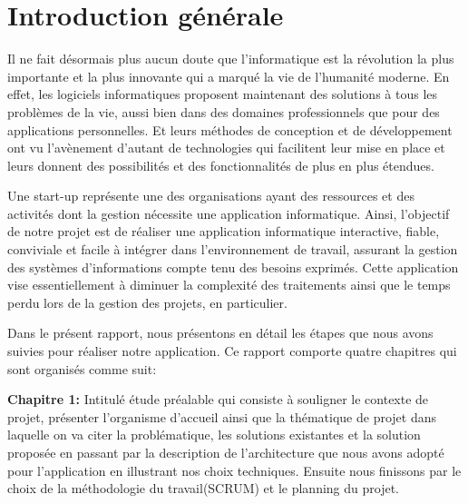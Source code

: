 






\chapter*{Introduction g\'{e}n\'{e}rale}


Il ne fait d\'{e}sormais plus aucun doute que l'informatique est la r\'{e}volution la
plus importante et la plus innovante qui a marqu\'{e} la vie de l'humanit\'{e}
moderne. En effet, les logiciels informatiques proposent maintenant des
solutions \`{a} tous les probl\`{e}mes de la vie, aussi bien dans des domaines
professionnels que pour des applications personnelles. Et leurs m\'{e}thodes de
conception et de d\'{e}veloppement ont vu l'av\`{e}nement d'autant de technologies
qui facilitent leur mise en place et leurs donnent des possibilit\'{e}s et des
fonctionnalit\'{e}s de plus en plus \'{e}tendues.


\bigskip
Une start-up repr\'{e}sente une des organisations ayant des ressources et des
activit\'{e}s dont la gestion n\'{e}cessite une application informatique. Ainsi,
l'objectif de notre projet est de r\'{e}aliser une application informatique
interactive, fiable, conviviale et facile \`{a} int\'{e}grer dans l'environnement de
travail, assurant la gestion des syst\`{e}mes d'informations compte tenu des
besoins exprim\'{e}s. Cette application vise essentiellement \`{a} diminuer la
complexit\'{e} des traitements ainsi que le temps perdu lors de la gestion des
projets, en particulier.

\bigskip


Dans le pr\'{e}sent rapport, nous pr\'{e}sentons en d\'{e}tail les \'{e}tapes que nous avons
suivies pour r\'{e}aliser notre application. Ce rapport comporte quatre chapitres
qui sont organis\'{e}s comme suit:

\bigskip
\textbf{Chapitre 1:}
Intitul\'{e} \'{e}tude pr\'{e}alable qui consiste \`{a} souligner le contexte de projet,
pr\'{e}senter l'organisme d'accueil ainsi que la th\'{e}matique de projet dans
laquelle on va citer la probl\'{e}matique, les solutions existantes et la solution
propos\'{e}e en passant par la description de l'architecture que nous avons adopt\'{e} pour
l'application en illustrant nos choix techniques. Ensuite nous finissons
par le choix de la méthodologie du travail(SCRUM)  et le planning du projet.

